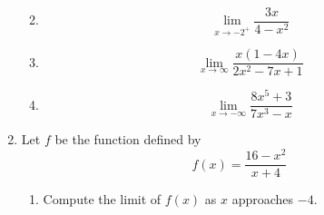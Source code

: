 \documentclass[fleqn,12pt]{article}
\newcommand{\<}{\ensuremath{\langle}}
\renewcommand{\>}{\ensuremath{\rangle}}
\begin{document}
\begin{enumerate}
\begin{enumerate}[{\it i.}]
        \bigskip

      \item 
        \label{item:2ii}
        \[
        \lim_{x\rightarrow -2^+} \frac{3x}{4-x^2}
        \]

        \bigskip

      \item 
        \label{item:2ii}
        \[
        \lim_{x \rightarrow \infty}\frac{x(1-4x)}{2x^2 - 7x +1}
        \]

        \bigskip

      \item 
        \label{item:2iii}
        \[
        \lim_{x \rightarrow -\infty}\frac{8x^5 + 3}{7x^3 - x}
        \]


      \end{enumerate}

      \vskip2cm

    \item
      \label{item:3} 
      Let $f$ be the function defined by
      \[
      f(x) = \frac{16-x^2}{x+4}
      \]

      \bigskip

      \begin{enumerate}[{\it i.}]
      \item Compute the limit of $f(x)$ as $x$ approaches $-4$.

        \bigskip

        \bigskip


\end{enumerate}
\end{enumerate}
\end{document}
